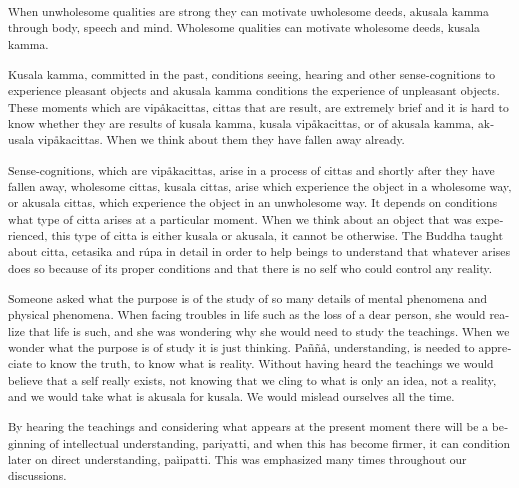 \textsuperscript{\textdutch{{When unwholesome qualities are strong they
can motivate uwholesome deeds, akusala kamma through body, speech and
mind. Wholesome qualities can motivate wholesome deeds, kusala kamma.
}}}

\textsuperscript{\textdutch{Kusala kamma, committed in the past,
conditions seeing, hearing and other sense-cognitions to experience
pleasant objects and akusala kamma conditions the experience of
unpleasant objects. These moments which are vipåkacittas, cittas that
are result, are extremely brief and it is hard to know whether they are
results of kusala kamma, kusala vipåkacittas, or of akusala kamma,
akusala vipåkacittas. When we think about them they have fallen away
already. }}

\textsuperscript{\textdutch{Sense-cognitions, which are vipåkacittas,
arise in a process of cittas and shortly after they have fallen away,
wholesome cittas, kusala cittas, arise which experience the object in a
wholesome way, or akusala cittas, which experience the object in an
unwholesome way. It depends on conditions what type of citta arises at a
particular moment. When we think about an object that was experienced,
this type of citta is either kusala or akusala, it cannot be otherwise.
The Buddha taught about citta, cetasika and rúpa in detail in order to
help beings to understand that whatever arises does so because of its
proper conditions and that there is no self who could control any
reality. }}

\textsuperscript{\textdutch{Someone asked what the purpose is of the
study of so many details of mental phenomena and physical phenomena.
When facing troubles in life such as the loss of a dear person, she
would realize that life is such, and she was wondering why she would
need to study the teachings. When we wonder what the purpose is of study
it is just thinking. Paññå, understanding, is needed to appreciate to
know the truth, to know what is reality. Without having heard the
teachings we would believe that a self really exists, not knowing that
we cling to what is only an idea, not a reality, and we would take what
is akusala for kusala. We would mislead ourselves all the time. }}

\textsuperscript{\textdutch{By hearing the teachings and considering
what appears at the present moment there will be a beginning of
intellectual understanding, pariyatti, and when this has become firmer,
it can condition later on direct understanding, paìipatti. This was
emphasized many times throughout our discussions. }}

